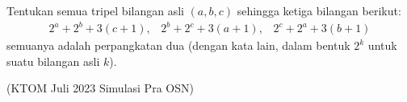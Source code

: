 Tentukan semua tripel bilangan asli $(a,b,c)$ sehingga ketiga bilangan berikut:
\begin{align*}
    2^a+2^b+3(c+1), \hspace{10pt} 2^b+2^c+3(a+1), \hspace{10pt} 2^c+2^a+3(b+1)
\end{align*}
semuanya adalah perpangkatan dua (dengan kata lain, dalam bentuk $2^k$ untuk suatu bilangan asli $k$).

(KTOM Juli 2023 Simulasi Pra OSN)